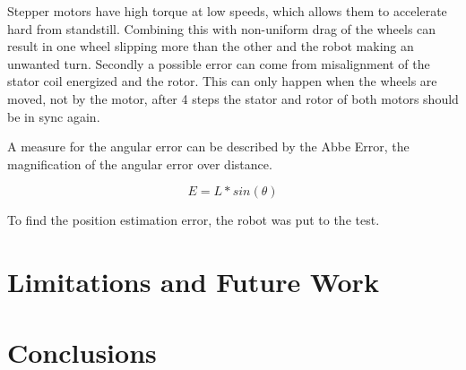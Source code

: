 \documentclass[letterpaper, 10 pt, conference]{ieeeconf}  %
\begin{document}
Stepper motors have high torque at low speeds, which allows them to accelerate hard from standstill.
Combining this with non-uniform drag of the wheels can result in one wheel slipping more than the other and the robot making an unwanted turn. 
Secondly a possible error can come from misalignment of the stator coil energized and the rotor.
This can only happen when the wheels are moved, not by the motor, after 4 steps the stator and rotor of both motors should be in sync again.

A measure for the angular error can be described by the Abbe Error, the magnification of the angular error over distance.

\begin{equation}
	E = L * sin(\theta)
\end{equation}

To find the position estimation error, the robot was put to the test.












\section{Limitations and Future Work}





\section{Conclusions}


\end{document}
